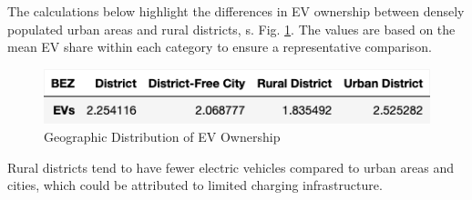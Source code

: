 The calculations below highlight the differences in EV ownership between densely populated urban areas and rural districts, s. Fig. \ref{fig: ev_percentage}. The values are based on the mean EV share within each category to ensure a representative comparison.
\begin{figure}[H]
	\begin{center}
		\includegraphics[width=\linewidth]{images/EVs_mean.png}
		\caption{Geographic Distribution of EV Ownership}
		\label{fig: ev_percentage}
	\end{center}
\end{figure}
Rural districts tend to have fewer electric vehicles compared to urban areas and cities, which could be attributed to limited charging infrastructure.
	